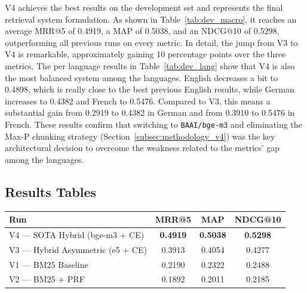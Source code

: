 V4 achieves the best results on the development set and represents the final retrieval system formulation. As shown in Table~\ref{tab:dev_macro}, it reaches an average MRR@5 of 0.4919, a MAP of 0.5038, and an NDCG@10 of 0.5298, outperforming all previous runs on every metric. In detail, the jump from V3 to V4 is remarkable, approximately gaining 10 percentage points over the three metrics.
\noindent The per language results in Table~\ref{tab:dev_lang} show that V4 is also the most balanced system among the languages. English decreases a bit to 0.4898, which is really close to the best previous English results, while German increases to 0.4382 and French to 0.5476. Compared to V3, this means a substantial gain from 0.2919 to 0.4382 in German and from 0.3910 to 0.5476 in French. These results confirm that switching to \texttt{BAAI/bge-m3} and eliminating the Max-P chunking strategy (Section~\ref{subsec:methodology_v4}) was the key architectural decision to overcome the weakness related to the metrics' gap among the languages.


\subsection{Results Tables}

\vspace{1em}
\noindent
\begin{minipage}{\linewidth}
\centering
{}
\label{tab:dev_macro}
\begin{tabularx}{\linewidth}{LCCC}
\toprule
\textbf{Run} & \textbf{MRR@5} & \textbf{MAP} & \textbf{NDCG@10} \\
\midrule
V4 — SOTA Hybrid (bge-m3 + CE)   & \textbf{0.4919} & \textbf{0.5038} & \textbf{0.5298} \\
V3 — Hybrid Asymmetric (e5 + CE) & 0.3913          & 0.4054          & 0.4277          \\
V1 — BM25 Baseline               & 0.2190          & 0.2322          & 0.2488          \\
V2 — BM25 + PRF                  & 0.1892          & 0.2011          & 0.2185          \\
\bottomrule
\end{tabularx}
\end{minipage}
\vspace{1em}

